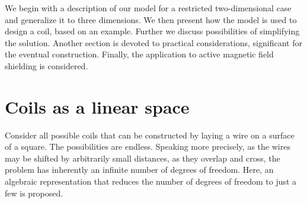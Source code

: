 We begin with a description of our model for a restricted two-dimensional case and generalize it to three dimensions. We then present how the model is used to design a coil, based on an example. Further we discuss possibilities of simplifying the solution. Another section is devoted to practical considerations, significant for the eventual construction. Finally, the application to active magnetic field shielding is considered.




\section{Coils as a linear space}
Consider all possible coils that can be constructed by laying a wire on a surface of a square. The possibilities are endless. Speaking more precisely, as the wires may be shifted by arbitrarily small distances, as they overlap and cross, the problem has inherently an infinite number of degrees of freedom. Here, an algebraic representation that reduces the number of degrees of freedom to just a few is proposed.

